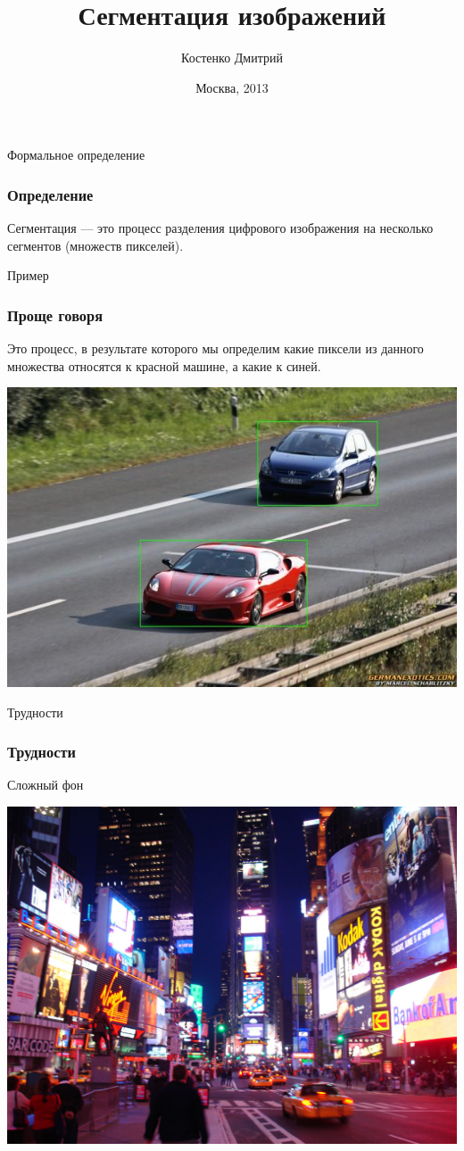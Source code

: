 \documentclass{beamer}
\begin{document}
\title{Сегментация  изображений}  
\author{Костенко Дмитрий}

\date{Москва, 2013} 
\frame{\titlepage}




\begin{frame}{Формальное определение}
\frametitle{Определение}
Сегментация — это процесс разделения цифрового изображения на несколько сегментов (множеств пикселей).
\end{frame}


\begin{frame}{Пример}
\frametitle{Проще говоря}
Это процесс, в результате которого мы определим какие пиксели из данного множества относятся к красной машине, а какие к синей. 

 \begin{center}
  \includegraphics[width= 0.8\linewidth]{images/cars.jpg}  
 \end{center}
 
\end{frame}




\begin{frame}{Трудности}
\frametitle{Трудности}
Сложный фон
 \begin{center}
  \includegraphics[width= 0.8\linewidth]{images/complex_background.jpg}  
 \end{center}
\end{frame}
\end{document}
